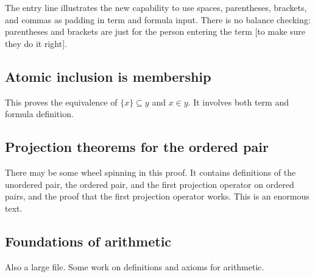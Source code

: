 \documentclass{article}
\begin{document}
The entry line illustrates the new capability to use spaces, parentheses, brackets, and commas as padding in term and formula input.  There is no balance checking:
parentheses and brackets are just for the person entering the term [to make sure they do it right].




\subsection{Atomic inclusion is membership}

This proves the equivalence of $\{x\} \subseteq y$ and $x \in y$.  It involves both term and formula definition.



\subsection{Projection theorems for the ordered pair}
There may be some wheel spinning in this proof.  It contains definitions of the unordered pair, the ordered pair,
and the first projection operator on ordered pairs, and the proof that the first projection operator works.  This is an enormous text.



\subsection{Foundations of arithmetic}

Also a large file.  Some work on definitions and axioms for arithmetic.


\end{document}
